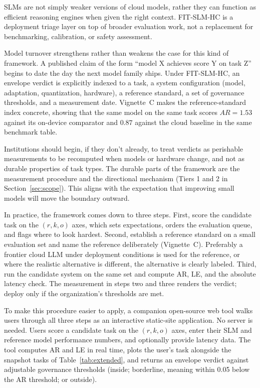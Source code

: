 \documentclass[11pt]{article}
\begin{document}
SLMs are not simply weaker versions of cloud models, rather they can function as efficient reasoning engines when given the right context. FIT-SLM-HC is a deployment triage layer on top of broader evaluation work, not a replacement for benchmarking, calibration, or safety assessment.

Model turnover strengthens rather than weakens the case for this kind of framework. A published claim of the form ``model X achieves score Y on task Z'' begins to date the day the next model family ships. Under FIT-SLM-HC, an envelope verdict is explicitly indexed to a task, a system configuration (model, adaptation, quantization, hardware), a reference standard, a set of governance thresholds, and a measurement date. Vignette~C makes the reference-standard index concrete, showing that the same model on the same task scores $AR = 1.53$ against its on-device comparator and $0.87$ against the cloud baseline in the same benchmark table.

Institutions should begin, if they don't already, to treat verdicts as perishable measurements to be recomputed when models or hardware change, and not as durable properties of task types. The durable parts of the framework are the measurement procedure and the directional mechanism (Tiers 1 and 2 in Section~\ref{sec:scope}). This aligns with the expectation that improving small models will move the boundary outward.

In practice, the framework comes down to three steps. First, score the candidate task on the $(r, k, o)$ axes, which sets expectations, orders the evaluation queue, and flags where to look hardest. Second, establish a reference standard on a small evaluation set and name the reference deliberately (Vignette~C). Preferably a frontier cloud LLM under deployment conditions is used for the reference, or where the realistic alternative is different, the alternative is clearly labeled. Third, run the candidate system on the same set and compute AR, LE, and the absolute latency check. The measurement in steps two and three renders the verdict; deploy only if the organization's thresholds are met.

To make this procedure easier to apply, a companion open-source web tool \cite{Williams2026FITSLMHCTool} walks users through all three steps as an interactive static-site application. No server is needed. Users score a candidate task on the $(r, k, o)$ axes, enter their SLM and reference model performance numbers, and optionally provide latency data. The tool computes AR and LE in real time, plots the user's task alongside the snapshot tasks of Table~\ref{tab:extended}, and returns an envelope verdict against adjustable governance thresholds (inside; borderline, meaning within 0.05 below the AR threshold; or outside).
\end{document}

